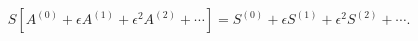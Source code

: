 \begin{equation}
S[A^{\left( 0\right) }+\epsilon A^{\left( 1\right) }+\epsilon ^{2}A^{\left(
2\right) }+\cdots ]=S^{\left( 0\right) }+\epsilon S^{\left( 1\right)
}+\epsilon ^{2}S^{\left( 2\right) }+\cdots .
\end{equation}%

